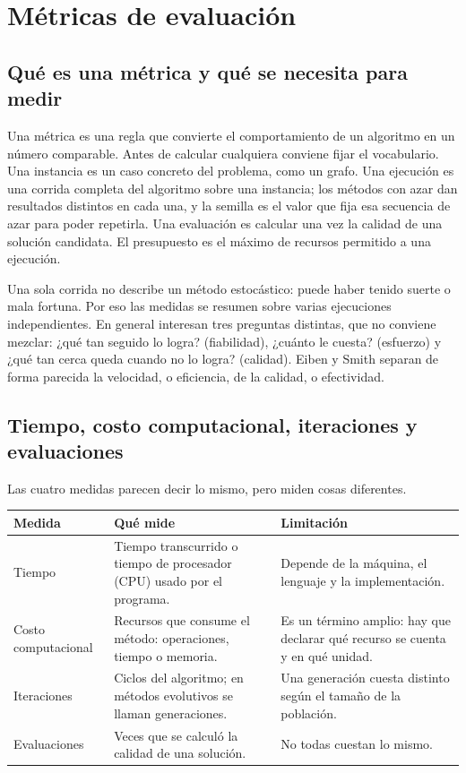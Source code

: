 \section{Métricas de evaluación}
\subsection{Qué es una métrica y qué se necesita para medir}
Una métrica es una regla que convierte el comportamiento de un algoritmo en un número comparable. Antes de calcular cualquiera conviene fijar el vocabulario. Una instancia es un caso concreto del problema, como un grafo. Una ejecución es una corrida completa del algoritmo sobre una instancia; los métodos con azar dan resultados distintos en cada una, y la semilla es el valor que fija esa secuencia de azar para poder repetirla. Una evaluación es calcular una vez la calidad de una solución candidata. El presupuesto es el máximo de recursos permitido a una ejecución.

Una sola corrida no describe un método estocástico: puede haber tenido suerte o mala fortuna. Por eso las medidas se resumen sobre varias ejecuciones independientes.\cite{de5} En general interesan tres preguntas distintas, que no conviene mezclar: ¿qué tan seguido lo logra? (fiabilidad), ¿cuánto le cuesta? (esfuerzo) y ¿qué tan cerca queda cuando no lo logra? (calidad). Eiben y Smith separan de forma parecida la velocidad, o eficiencia, de la calidad, o efectividad.\cite{de7}

\subsection{Tiempo, costo computacional, iteraciones y evaluaciones}
Las cuatro medidas parecen decir lo mismo, pero miden cosas diferentes.

\begin{center}

\begin{adjustbox}{max width=\linewidth}
\begin{tabular}{@{}P{2.6cm}P{6.6cm}P{6.6cm}@{}}
\toprule
Medida & Qué mide & Limitación\\
\midrule
Tiempo & Tiempo transcurrido o tiempo de procesador (CPU) usado por el programa. & Depende de la máquina, el lenguaje y la implementación.\\
Costo computacional & Recursos que consume el método: operaciones, tiempo o memoria. & Es un término amplio: hay que declarar qué recurso se cuenta y en qué unidad.\\
Iteraciones & Ciclos del algoritmo; en métodos evolutivos se llaman generaciones. & Una generación cuesta distinto según el tamaño de la población.\\
Evaluaciones & Veces que se calculó la calidad de una solución. & No todas cuestan lo mismo.\\
\bottomrule
\end{tabular}
\end{adjustbox}
\end{center}

